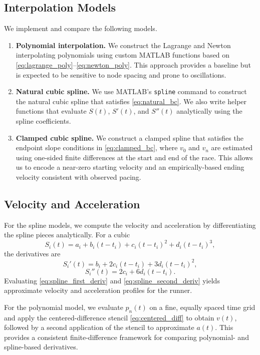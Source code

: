 \documentclass[12pt]{article}
\begin{document}
\subsection{Interpolation Models}
We implement and compare the following models.
\begin{enumerate}
\item \textbf{Polynomial interpolation.}
      We construct the Lagrange and Newton interpolating polynomials
      using custom MATLAB functions based on
      \eqref{eq:lagrange_poly}--\eqref{eq:newton_poly}. This approach
      provides a baseline but is expected to be sensitive to node
      spacing and prone to oscillations.

\item \textbf{Natural cubic spline.}
      We use MATLAB's \texttt{spline} command to construct the natural
      cubic spline that satisfies \eqref{eq:natural_bc}. We also write
      helper functions that evaluate $S(t)$, $S'(t)$, and $S''(t)$ analytically using the spline coefficients.

\item \textbf{Clamped cubic spline.}
      We construct a clamped spline that satisfies the endpoint slope conditions in \eqref{eq:clamped_bc}, where $v_0$ and $v_n$ are estimated using one-sided finite differences at the start and end of the race. This allows us to encode a near-zero starting velocity and an empirically-based ending velocity consistent with observed pacing.
\end{enumerate}

\subsection{Velocity and Acceleration}
For the spline models, we compute the velocity and acceleration by
differentiating the spline pieces analytically. For a cubic
\[
S_i(t) = a_i + b_i (t - t_i) + c_i (t - t_i)^2 + d_i (t - t_i)^3,
\]
the derivatives are
\begin{equation}
S_i'(t) = b_i + 2 c_i (t - t_i) + 3 d_i (t - t_i)^2,
\label{eq:spline_first_deriv}
\end{equation}
\begin{equation}
S_i''(t) = 2 c_i + 6 d_i (t - t_i).
\label{eq:spline_second_deriv}
\end{equation}
Evaluating \eqref{eq:spline_first_deriv} and
\eqref{eq:spline_second_deriv} yields approximate
velocity and acceleration profiles for the runner.

For the polynomial model, we evaluate $p_n(t)$ on a fine, equally spaced time grid and apply the centered-difference stencil \eqref{eq:centered_diff} to obtain $v(t)$, followed by a second application of the stencil to approximate $a(t)$. This provides a consistent finite-difference framework for comparing polynomial- and spline-based derivatives.
\end{document}
